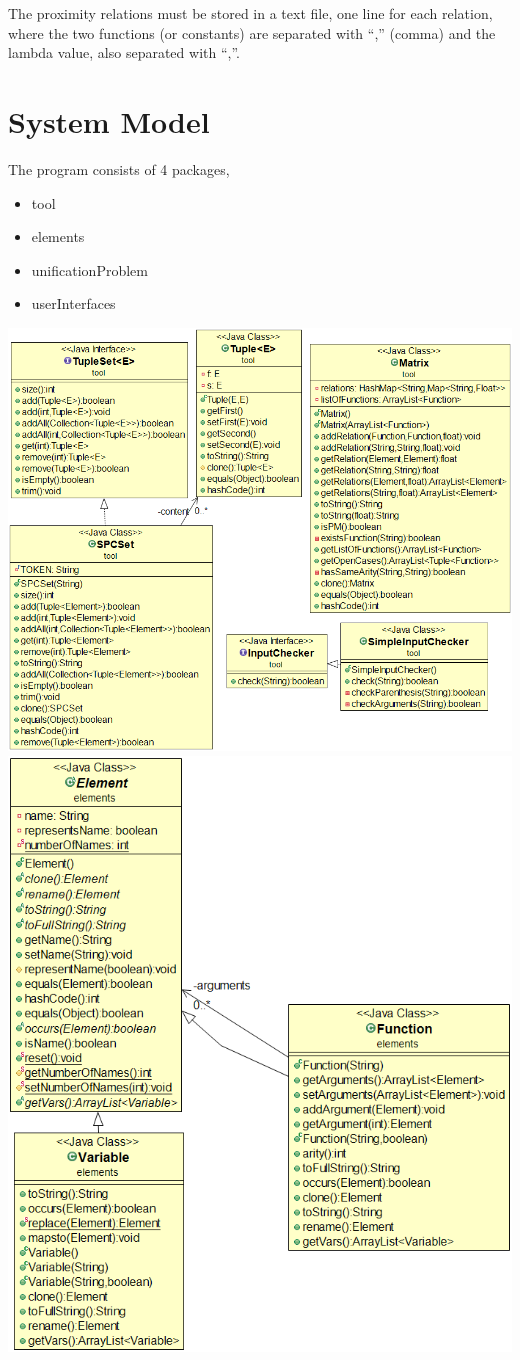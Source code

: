 \documentclass{article}
\begin{document}
The proximity relations must be stored in a text file, one line for each relation, where the two functions (or constants) are separated with ``,'' (comma) and the lambda value, also separated with ``,''.

\section{System Model}
The program consists of 4 packages,
\begin{itemize}
	\item tool
	\item elements
	\item unificationProblem
	\item userInterfaces
\end{itemize}
\includegraphics[scale=0.5]{ToolsModel}
\newpage
\includegraphics[scale=0.5]{ElementsModel}
\end{document}
